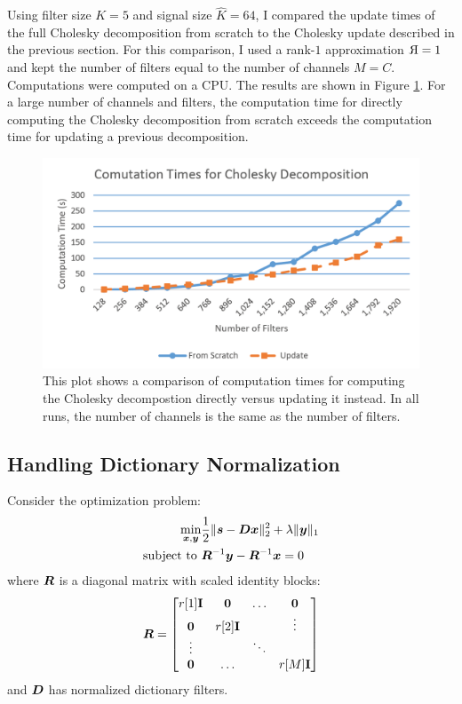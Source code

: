 Using filter size $K = 5$ and signal size $\hat{K} = 64$, I compared the update times of the full Cholesky decomposition from scratch to the Cholesky update described in the previous section. For this comparison, I used a rank-$1$ approximation $\reflectbox{R} = 1$ and kept the number of filters equal to the number of channels $M = C$. Computations were computed on a CPU. The results are shown in Figure \ref{Figure:Computational Comparison}. For a large number of channels and filters, the computation time for directly computing the Cholesky decomposition from scratch exceeds the computation time for updating a previous decomposition.

\begin{figure}
\includegraphics[width=\textwidth]{figures/computationtime_s.PNG}
\caption{This plot shows a comparison of computation times for computing the Cholesky decompostion directly versus updating it instead. In all runs, the number of channels is the same as the number of filters.}
\label{Figure:Computational Comparison}
\end{figure}


\subsection{Handling Dictionary Normalization}
Consider the optimization problem:
%
\begin{equation}
\begin{aligned}
\min_{\bm{x},\bm{y}} & \frac{1}{2}\|\bm{s} -\bm{D}\bm{x}\|_2^2 + \lambda\|\bm{y}\|_1 \\
\text{subject to } & \bm{R}^{-1}\bm{y} - \bm{R}^{-1}\bm{x} = 0 
\end{aligned}
\end{equation}
%
where $\bm{R}$ is a diagonal matrix with scaled identity blocks:
%
\begin{equation}
\bm{R} = \begin{bmatrix} r[1]{\bf I} & \bm{0} & \hdots & \bm{0} \\ \bm{0} & r[2]{\bf I} &  & \vdots \\ \vdots &  & \ddots &   \\ \bm{0} & \hdots &  & r[M]{\bf I} \end{bmatrix}
\end{equation}
%
and $\bm{D}$ has normalized dictionary filters.

